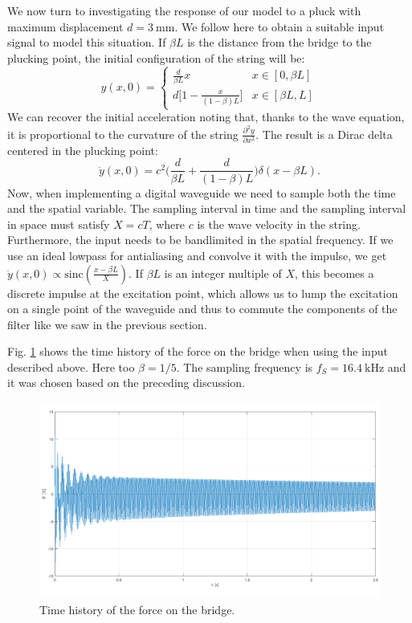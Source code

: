 \documentclass[a4paper]{article}
\begin{document}
We now turn to investigating the response of our model to a pluck with maximum displacement $d = \SI{3}{\milli\meter}$. We follow here \cite{smith92} to obtain a suitable input signal to model this situation. If $\beta L$ is the distance from the bridge to the plucking point, the initial configuration of the string will be:
$$ 
y(x, 0) = \left\{
	\begin{array}{lr}
		\frac{d}{\beta L}x & x \in [0, \beta L] \\[4pt]
		d \bigl[ 1 - \frac{x}{(1 - \beta) L} \bigr] & x \in [\beta L, L]
	\end{array}
\right.
$$
We can recover the initial acceleration noting that, thanks to the wave equation, it is proportional to the curvature of the string $\frac{\partial^2 y}{\partial x^2}$. The result is a Dirac delta centered in the plucking point:
$$
\ddot y(x, 0) = c^2 \biggl( \frac{d}{\beta L} + \frac{d}{(1 - \beta) L} \biggr) \delta(x - \beta L).
$$
Now, when implementing a digital waveguide we need to sample both the time and the spatial variable. The sampling interval in time and the sampling interval in space must satisfy $X = cT$, where $c$ is the wave velocity in the string. Furthermore, the input needs to be bandlimited in the spatial frequency. If we use an ideal lowpass for antialiasing and convolve it with the impulse, we get $\ddot y (x, 0) \propto \mathrm{sinc}\left( \frac{x-\beta L}{X} \right)$. If $\beta L$ is an integer multiple of $X$, this becomes a discrete impulse at the excitation point, which allows us to lump the excitation on a single point of the waveguide and thus to commute the components of the filter like we saw in the previous section.

Fig. \ref{fig:dleng} shows the time history of the force on the bridge when using the input described above. Here too $\beta = 1/5$. The sampling frequency is $f_S = \SI{16.4}{\kilo\hertz}$ and it was chosen based on the preceding discussion.


\begin{figure}[h]
	\centering
	\includegraphics[width=0.75\linewidth]{time.png}
	\caption{Time history of the force on the bridge.}
	\label{fig:dleng}
\end{figure}


\printbibliography
\end{document}
